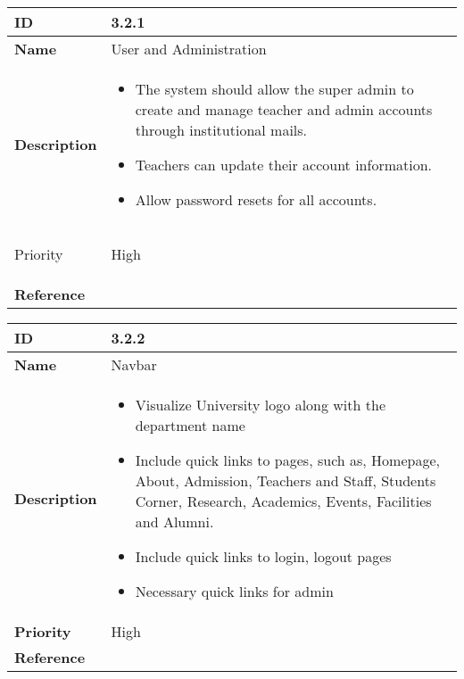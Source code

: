 \renewcommand{\arraystretch}{2}
\noindent
\begin{center}
\begin{tabular}{ | >{\bfseries}m{5em} | m{10cm} |  } 
  \hline
  ID & 3.2.1\\ 
  \hline
  Name & User and Administration \\ 
  \hline
  Description & 
  \begin{itemize}
      \item The system should allow the super admin to create and manage teacher and admin accounts through institutional mails.
      \item Teachers can update their account information.
      \item Allow password resets for all accounts.

  \end{itemize} \\
  \hline
  
  Priority & High\\
  \hline 
  Reference & \\
  \hline
\end{tabular}
\end{center}

\vspace{0.5cm}

\begin{center}
  \begin{tabular}{ | >{\bfseries}m{5em} | m{10cm} |  } 
    \hline
    ID & 3.2.2\\  
    \hline
    Name & Navbar \\  
    \hline
    Description & 
    \begin{itemize}
        \item Visualize University logo along with the department name
        \item Include quick links to pages, such as, Homepage, About, Admission, Teachers and Staff, Students Corner, Research, Academics, Events, Facilities and Alumni.
        \item Include quick links to login, logout pages
        \item Necessary quick links for admin
    \end{itemize} \\ 
    \hline
    Priority & High\\
    \hline 
    Reference & \\
    \hline
  \end{tabular}
  \end{center}

